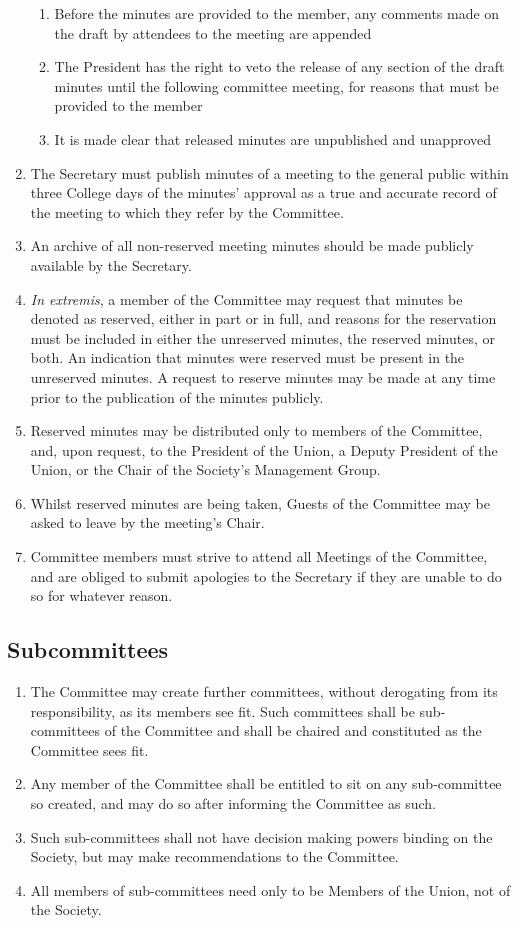 \documentclass[a4paper]{tufte-handout}
\begin{document}
\begin{enumerate}[resume]
\begin{enumerate}
            \item Before the minutes are provided to the member, any comments made on the draft by attendees to the meeting are appended
            \item The President has the right to veto the release of any section of the draft minutes until the following committee meeting, for reasons that must be provided to the member
            \item It is made clear that released minutes are unpublished and unapproved
        \end{enumerate}
    \item The Secretary must publish minutes of a meeting to the general public within three College days of the minutes' approval as a true and accurate record of the meeting to which they refer by the Committee.
    \item An archive of all non-reserved meeting minutes should be made publicly available by the Secretary.
    \item \textit{In extremis}, a member of the Committee may request that minutes be denoted as reserved, either in part or in full, and reasons for the reservation must be included in either the unreserved minutes, the reserved minutes, or both. An indication that minutes were reserved must be present in the unreserved minutes. A request to reserve minutes may be made at any time prior to the publication of the minutes publicly.
    \item Reserved minutes may be distributed only to members of the Committee, and, upon request, to the President of the Union, a Deputy President of the Union, or the Chair of the Society's Management Group.
    \item Whilst reserved minutes are being taken, Guests of the Committee may be asked to leave by the meeting's Chair.
    \item Committee members must strive to attend all Meetings of the Committee, and are obliged to submit apologies to the Secretary if they are unable to do so for whatever reason.
\end{enumerate}

\subsection{Subcommittees}
\begin{enumerate}[resume]
    \item The Committee may create further committees, without derogating from its responsibility, as its members see fit. Such committees shall be sub-committees of the Committee and shall be chaired and constituted as the Committee sees fit.
    \item Any member of the Committee shall be entitled to sit on any sub-committee so created, and may do so after informing the Committee as such.
    \item Such sub-committees shall not have decision making powers binding on the Society, but may make recommendations to the Committee.
    \item All members of sub-committees need only to be Members of the Union, not of the Society.
\end{enumerate}
\end{document}
